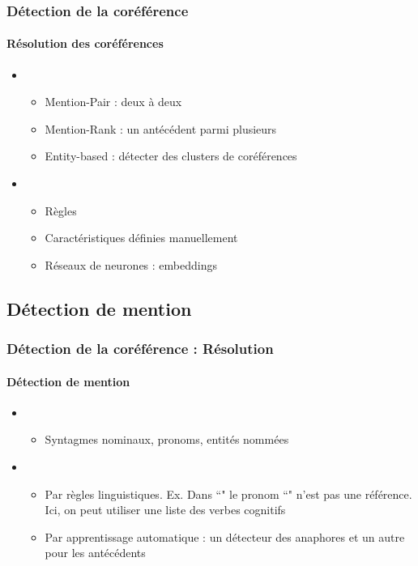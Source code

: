 \documentclass[xcolor=table]{beamer}
\begin{document}
\begin{frame}
	\frametitle{Détection de la coréférence}
	\framesubtitle{Résolution des coréférences}
	
	
	\begin{itemize}
		\item {}
		\begin{itemize}
			\item Mention-Pair : deux à deux
			\item Mention-Rank : un antécédent parmi plusieurs
			\item Entity-based : détecter des clusters de coréférences
		\end{itemize}
		
		\item {}
		\begin{itemize}
			\item Règles
			\item Caractéristiques définies manuellement
			\item Réseaux de neurones : embeddings
		\end{itemize}
	\end{itemize}
	
\end{frame}


\subsection{Détection de mention}

\begin{frame}
	\frametitle{Détection de la coréférence : Résolution}
	\framesubtitle{Détection de mention}
	
	\begin{itemize}
		\item {}
		\begin{itemize}
			\item Syntagmes nominaux, pronoms, entités nommées
		\end{itemize}
	
		\item {}
		\begin{itemize}
			\item Par règles linguistiques. Ex. Dans ``" le pronom ``" n'est pas une référence. Ici, on peut utiliser une liste des verbes cognitifs 
			\item Par apprentissage automatique : un détecteur des anaphores et un autre pour les antécédents
		\end{itemize}
	
	\end{itemize}
	
\end{frame}
\end{document}
